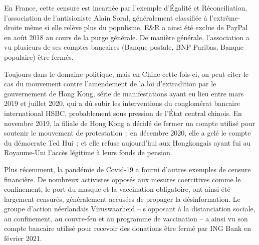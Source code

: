 
En France, cette censure est incarnée par l'exemple d'Égalité et Réconciliation, l'association de l'antisioniste Alain Soral, généralement classifiée à l'extrême-droite même si elle relève plus du populisme. E\&R a ainsi été exclue de PayPal en août 2018 au cours de la purge générale. De manière générale, l'association a vu plusieurs de ses comptes bancaires (Banque postale, BNP Paribas, Banque populaire) être fermés.

Toujours dans le domaine politique, mais en Chine cette fois-ci, on peut citer le cas du mouvement contre l'amendement de la loi d'extradition par le gouvernement de Hong Kong, série de manifestations ayant eu lieu entre mars 2019 et juillet 2020, qui a dû subir les interventions du conglomérat bancaire international HSBC, probablement sous pression de l'État central chinois. En novembre 2019, la filiale de Hong Kong a décidé de fermer un compte utilisé pour soutenir le mouvement de protestation~; en décembre 2020, elle a gelé le compte du démocrate Ted Hui~; et elle refuse aujourd'hui aux Hongkongais ayant fui au Royaume-Uni l'accès légitime à leurs fonds de pension.

Plus récemment, la pandémie de Covid-19 a fourni d'autres exemples de censure financière. De nombreux activistes opposés aux mesures coercitives comme le confinement, le port du masque et la vaccination obligatoire, ont ainsi été largement censurés, généralement accusées de propager la désinformation. Le groupe d'action néerlandais Viruswaarheid -- s'opposant à la distanciation sociale, au confinement, au couvre-feu et au programme de vaccination -- a ainsi vu son compte bancaire utilisé pour recevoir des donations être fermé par ING Bank en février 2021.

